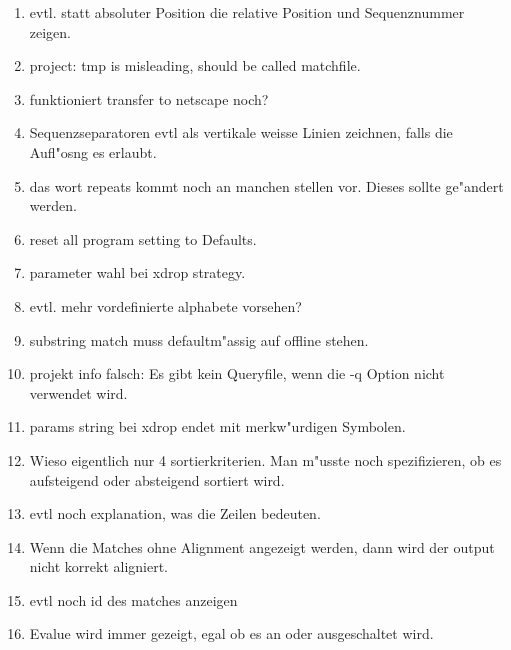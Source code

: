 \documentclass[12pt]{article}
\begin{document}
\begin{enumerate}
\item
evtl. statt absoluter Position die relative Position und Sequenznummer zeigen.
\item
project: tmp is misleading, should be called matchfile.
\item
funktioniert transfer to netscape noch?
\item
Sequenzseparatoren evtl als vertikale weisse Linien zeichnen, falls
die Aufl"osng es erlaubt.
\item
das wort repeats kommt noch an manchen
stellen vor. Dieses sollte ge"andert werden.
\item
reset all program
setting to Defaults.
\item
parameter wahl bei xdrop strategy.
\item
evtl. mehr vordefinierte alphabete vorsehen?
\item
substring match muss
defaultm"assig auf
offline stehen.
\item
projekt info falsch: Es gibt kein
Queryfile, wenn die -q Option nicht verwendet
wird.
\item
params string bei xdrop endet mit merkw"urdigen Symbolen.
\item
Wieso eigentlich nur 4 sortierkriterien. Man m"usste noch spezifizieren,
ob es aufsteigend oder absteigend sortiert wird.
\item
evtl noch explanation, was die Zeilen bedeuten.
\item
Wenn die Matches ohne Alignment angezeigt werden,
dann wird der output nicht korrekt aligniert.
\item
evtl noch id des matches anzeigen
\item
Evalue wird immer gezeigt, egal ob es an oder ausgeschaltet wird.
\end{enumerate}
\end{document}
